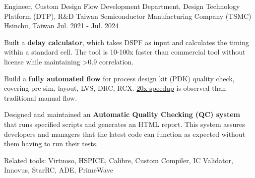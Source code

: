 

\begin{cventries}

  \cventry
    {Engineer, Custom Design Flow Development Department, Design Technology Platform (DTP), R\&D} %
    {Taiwan Semiconductor Manufacturing Company (TSMC)} %
    {Hsinchu, Taiwan} %
    {Jul. 2021 - Jul. 2024} %
    {
        \begin{cvitems} %
        \item Built a \textbf{delay calculator}, which takes DSPF as input and calculates the timing within a standard cell. 
        The tool is 10-100x faster than commercial tool without license while maintaining >0.9 correlation.
        \item Build a \textbf{fully automated flow} for process design kit (PDK) quality check, covering pre-sim, layout, LVS, DRC, RCX. \ul{20x speedup} is observed than traditional manual flow.
        \item Designed and maintained an \textbf{Automatic Quality Checking (QC) system} that runs specified scripts and generates an HTML report. This system assures developers and managers that the latest code can function as expected without them having to run their tests.
        \item Related tools: Virtuoso, HSPICE, Calibre, Custom Compiler, IC Validator, Innovus, StarRC, ADE, PrimeWave
        \end{cvitems}
    }


\end{cventries}
